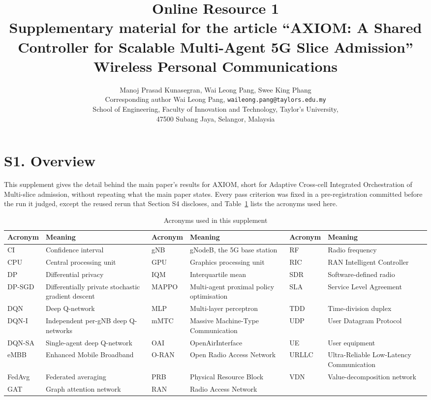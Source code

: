 \documentclass[9pt]{extarticle}
\title{Online Resource 1\\[4pt]\large Supplementary material for the article ``AXIOM: A Shared Controller for Scalable Multi-Agent 5G Slice Admission''\\[2pt]\normalsize Wireless Personal Communications}
\author{Manoj Prasad Kunasegran, Wai Leong Pang, Swee King Phang\\[4pt]
\small Corresponding author Wai Leong Pang, \texttt{waileong.pang@taylors.edu.my}\\
\small School of Engineering, Faculty of Innovation and Technology, Taylor's University,\\
\small 47500 Subang Jaya, Selangor, Malaysia}
\date{}
\begin{document}
\maketitle

\section*{S1. Overview}
This supplement gives the detail behind the main paper's results for AXIOM, short for Adaptive Cross-cell Integrated Orchestration of Multi-slice admission, without repeating what the main paper states. Every pass criterion was fixed in a pre-registration committed before the run it judged, except the reused rerun that Section S4 discloses, and Table~\ref{tab:s-acronyms} lists the acronyms used here.

\begin{table}[!htbp]
\caption{Acronyms used in this supplement}
\label{tab:s-acronyms}
\centering
\scriptsize
{\setlength{\tabcolsep}{3pt}
\begin{tabular}{@{}l>{\raggedright\arraybackslash}p{}@{\hspace{1em}}l>{\raggedright\arraybackslash}p{}@{\hspace{1em}}l>{\raggedright\arraybackslash}p{}@{}}
\toprule
Acronym & Meaning & Acronym & Meaning & Acronym & Meaning \\
\midrule
CI & Confidence interval & gNB & gNodeB, the 5G base station & RF & Radio frequency \\
CPU & Central processing unit & GPU & Graphics processing unit & RIC & RAN Intelligent Controller \\
DP & Differential privacy & IQM & Interquartile mean & SDR & Software-defined radio \\
DP-SGD & Differentially private stochastic gradient descent & MAPPO & Multi-agent proximal policy optimisation & SLA & Service Level Agreement \\
DQN & Deep Q-network & MLP & Multi-layer perceptron & TDD & Time-division duplex \\
DQN-I & Independent per-gNB deep Q-networks & mMTC & Massive Machine-Type Communication & UDP & User Datagram Protocol \\
DQN-SA & Single-agent deep Q-network & OAI & OpenAirInterface & UE & User equipment \\
eMBB & Enhanced Mobile Broadband & O-RAN & Open Radio Access Network & URLLC & Ultra-Reliable Low-Latency Communication \\
FedAvg & Federated averaging & PRB & Physical Resource Block & VDN & Value-decomposition network \\
GAT & Graph attention network & RAN & Radio Access Network &  &  \\
\bottomrule
\end{tabular}}
\end{table}
\end{document}
